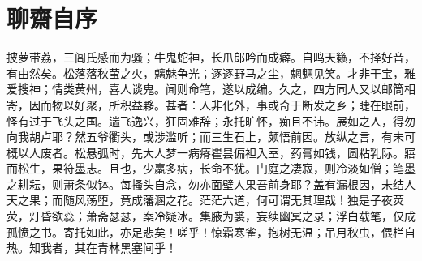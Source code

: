 \section{ 聊齋自序}
披萝带荔，三闾氏感而为骚；牛鬼蛇神，长爪郎吟而成癖。自鸣天籁，不择好音，有由然矣。松落落秋萤之火，魑魅争光；逐逐野马之尘，魍魉见笑。才非干宝，雅爱搜神；情类黄州，喜人谈鬼。闻则命笔，遂以成编。久之，四方同人又以邮筒相寄，因而物以好聚，所积益夥。甚者：人非化外，事或奇于断发之乡；睫在眼前，怪有过于飞头之国。遄飞逸兴，狂固难辞；永托旷怀，痴且不讳。展如之人，得勿向我胡卢耶？然五爷衢头，或涉滥听；而三生石上，颇悟前因。放纵之言，有未可概以人废者。松悬弧时，先大人梦一病瘠瞿昙偏袒入室，药膏如钱，圆粘乳际。寤而松生，果符墨志。且也，少羸多病，长命不犹。门庭之凄寂，则冷淡如僧；笔墨之耕耘，则萧条似钵。每搔头自念，勿亦面壁人果吾前身耶？盖有漏根因，未结人天之果；而随风荡堕，竟成藩溷之花。茫茫六道，何可谓无其理哉！独是子夜荧荧，灯昏欲蕊；萧斋瑟瑟，案冷疑冰。集腋为裘，妄续幽冥之录；浮白载笔，仅成孤愤之书。寄托如此，亦足悲矣！嗟乎！惊霜寒雀，抱树无温；吊月秋虫，偎栏自热。知我者，其在青林黑塞间乎！